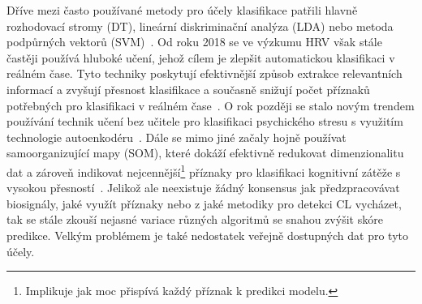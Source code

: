 Dříve mezi často používané metody pro účely klasifikace patřili hlavně
rozhodovací stromy (\gls{DT}), lineární diskriminační analýza (\gls{LDA}) nebo
metoda podpůrných vektorů (\gls{SVM})~\cite{Ishaque2021}. Od roku 2018 se ve
výzkumu HRV však stále častěji používá hluboké učení, jehož cílem je zlepšit
automatickou klasifikaci v reálném čase. Tyto techniky poskytují efektivnější
způsob extrakce relevantních informací a zvyšují přesnost klasifikace a současně
snižují počet příznaků potřebných pro klasifikaci v reálném
čase~\cite{Hwang2018,He2019}. O rok později se stalo novým trendem používání
technik učení bez učitele pro klasifikaci psychického stresu s využitím
technologie autoenkodéru~\cite{Oskooei2019}. Dále se mimo jiné začaly hojně
používat samoorganizující mapy (\gls{SOM}), které dokáží efektivně redukovat
dimenzionalitu dat a zároveň indikovat nejcennější\footnote{Implikuje jak moc
přispívá každý příznak k predikci modelu.} příznaky pro klasifikaci kognitivní
zátěže s vysokou přesností~\cite{Cho2017}. Jelikož ale neexistuje žádný
konsensus jak předzpracovávat biosignály, jaké využít příznaky nebo z jaké
metodiky pro detekci CL vycházet, tak se stále zkouší nejasné variace různých
algoritmů se snahou zvýšit skóre predikce. Velkým problémem je také nedostatek
veřejně dostupných dat pro tyto účely.

